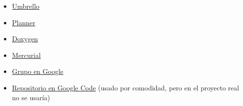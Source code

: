 \begin{itemize}
\item \href{http://uml.sourceforge.net/}{Umbrello}
\item \href{http://live.gnome.org/Planner}{Planner}
\item \href{http://www.doxygen.org}{Doxygen}
\item \href{http://mercurial.selenic.com/}{Mercurial}
\item \href{http://groups.google.com/group/uclm-iso2-p2-android?hl=es}{Grupo en Google}
\item \href{https://code.google.com/p/iso2-p2-android/}{Repositorio en Google
Code} (usado por comodidad, pero en el proyecto real no se usaría)
\end{itemize}
